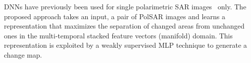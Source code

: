 DNNs have previously been used  for single polarimetric SAR images~\cite{zhang2016deep} only. 
The proposed approach takes an input, a pair of PolSAR images and learns a representation that maximizes the separation of changed areas from  unchanged ones in the multi-temporal stacked feature vectors (manifold) domain. This representation is  exploited by a weakly supervised MLP technique to generate a change map. 
